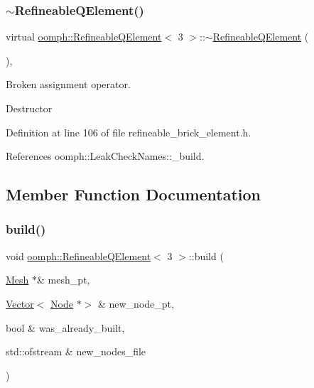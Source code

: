 \subsubsection{\texorpdfstring{$\sim$\+Refineable\+Q\+Element()}{~RefineableQElement()}}
{\footnotesize\ttfamily virtual \hyperlink{classoomph_1_1RefineableQElement}{oomph\+::\+Refineable\+Q\+Element}$<$ 3 $>$\+::$\sim$\hyperlink{classoomph_1_1RefineableQElement}{Refineable\+Q\+Element} (\begin{DoxyParamCaption}{ }\end{DoxyParamCaption})\hspace{0.3cm}{\ttfamily [inline]}, {\ttfamily [virtual]}}



Broken assignment operator. 

Destructor 

Definition at line 106 of file refineable\+\_\+brick\+\_\+element.\+h.



References oomph\+::\+Leak\+Check\+Names\+::\+\_\+build.



\subsection{Member Function Documentation}
\mbox{\label{classoomph_1_1RefineableQElement_3_013_01_4_a8e7f6c2a6aa695c1b6fcd4dbeba3fac6}} 
\subsubsection{\texorpdfstring{build()}{build()}}
{\footnotesize\ttfamily void \hyperlink{classoomph_1_1RefineableQElement}{oomph\+::\+Refineable\+Q\+Element}$<$ 3 $>$\+::build (\begin{DoxyParamCaption}\item[{\hyperlink{classoomph_1_1Mesh}{Mesh} $\ast$\&}]{mesh\+\_\+pt,  }\item[{\hyperlink{classoomph_1_1Vector}{Vector}$<$ \hyperlink{classoomph_1_1Node}{Node} $\ast$$>$ \&}]{new\+\_\+node\+\_\+pt,  }\item[{bool \&}]{was\+\_\+already\+\_\+built,  }\item[{std\+::ofstream \&}]{new\+\_\+nodes\+\_\+file }\end{DoxyParamCaption})\hspace{0.3cm}{\ttfamily [virtual]}}



